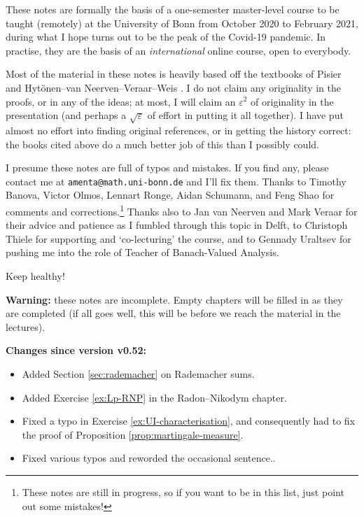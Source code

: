These notes are formally the basis of a one-semester master-level course to be taught (remotely) at the University of Bonn from October 2020 to February 2021, during what I hope turns out to be the peak of the Covid-19 pandemic.
In practise, they are the basis of an \emph{international} online course, open to everybody.

Most of the material in these notes is heavily based off the textbooks of Pisier \cite{gP16} and Hyt\"onen--van Neerven--Veraar--Weis \cite{HNVW16, HNVW17}.
I do not claim any originality in the proofs, or in any of the ideas; at most, I will claim an $\varepsilon^2$ of originality in the presentation (and perhaps a $\sqrt{\varepsilon}$ of effort in putting it all together).
I have put almost no effort into finding original references, or in getting the history correct: the books cited above do a much better job of this than I possibly could.

\vspace{1cm}

I presume these notes are full of typos and mistakes.
If you find any, please contact me at \texttt{amenta@math.uni-bonn.de} and I'll fix them.
Thanks to Timothy Banova, Victor Olmos, Lennart Ronge, Aidan Schumann, and Feng Shao for comments and corrections.\footnote{These notes are still in progress, so if you want to be in this list, just point out some mistakes!}
Thanks also to Jan van Neerven and Mark Veraar for their advice and patience as I fumbled through this topic in Delft, to Christoph Thiele for supporting and `co-lecturing' the course, and to Gennady Uraltsev for pushing me into the role of Teacher of Banach-Valued Analysis.

\vspace{1cm}

Keep healthy! 




\vspace{2cm}

\textbf{Warning:} these notes are incomplete.
Empty chapters will be filled in as they are completed (if all goes well, this will be before we reach the material in the lectures).

\textbf{Changes since version v0.52:}
\begin{itemize}
\item Added Section \ref{sec:rademacher} on Rademacher sums.
\item Added Exercise \ref{ex:Lp-RNP} in the Radon--Nikodym chapter.
\item Fixed a typo in Exercise \ref{ex:UI-characterisation}, and consequently had to fix the proof of Proposition \ref{prop:martingale-measure}.
\item Fixed various typos and reworded the occasional sentence..

  
\end{itemize}





